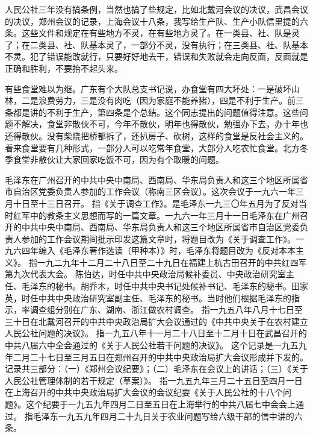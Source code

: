 人民公社三年没有搞条例，当然也搞了些规定，比如北戴河会议的决议，武昌会议的决议，郑州会议的记录，上海会议十八条，我写给生产队、生产小队信里提的六条。这些文件和规定在有些地方不灵，在有些地方灵了。在一类县、社、队是灵了；在二类县、社、队基本灵了，一部分不灵，没有执行；在三类县、社、队基本不灵。犯了错误能改就行，只要好好地去干，错误和失败就会走向反面，反面就是正确和胜利，不要抬不起头来。

有些食堂难以为继。广东有个大队总支书记说，办食堂有四大坏处：一是破坏山林，二是浪费劳力，三是没有肉吃（因为家庭不能养猪），四是不利于生产。前三条都是讲的不利于生产，第四条是个总结。这个同志提出的问题值得注意。这些问题不解决，食堂非散伙不可，今年不散伙，明年也得散伙，勉强办下去，办十年也还得散伙。没有柴烧把桥都拆了，还扒房子、砍树，这样的食堂是反社会主义的。看来食堂要有几种形式，一部分人可以吃常年食堂，大部分人吃农忙食堂。北方冬季食堂非散伙让大家回家吃饭不可，因为有个取暖的问题。

\begin{maonote}
毛泽东在广州召开的中共中央中南局、西南局、华东局负责人和这三个地区所属省市自治区党委负责人参加的工作会议（称南三区会议）。这次会议于一九六一年三月十日至十三日召开。
指《关于调查工作》。是毛泽东一九三〇年五月为了反对当时红军中的教条主义思想而写的一篇文章。一九六一年三月十一日毛泽东在广州召开的中共中央中南局、西南局、华东局负责人和这三个地区所属省市自治区党委负责人参加的工作会议期间批示印发这篇文章时，将题目改为《关于调查工作》。一九六四年编入《毛泽东著作选读（甲种本）》时，毛泽东将题目改为《反对本本主义》。
指一九二九年十二月二十八日至二十九日在福建上杭古田召开的中共红四军第九次代表大会。
陈伯达，时任中共中央政治局候补委员、中央政治研究室主任、毛泽东的秘书。胡乔木，时任中共中央书记处候补书记、毛泽东的秘书。田家英，时任中共中央政治研究室副主任、毛泽东的秘书。当时他们根据毛泽东的指示，率调查组分别在广东、湖南、浙江做农村调查。
指一九五八年八月十七日至三十日在北戴河召开的中共中央政治局扩大会议通过的《中共中央关于在农村建立人民公社问题的决议》。
指一九五八年十一月二十八日至十二月十日在武昌召开的中共八届六中全会通过的《关于人民公社若干问题的决议》。
这个记录是一九五九年二月二十七日至三月五日在郑州召开的中共中央政治局扩大会议形成并下发的。记录共三部分：（一）《郑州会议纪要》；（二）毛泽东在会议上的讲话；（三）《关于人民公社管理体制的若干规定（草案）》。
指一九五九年三月二十五日至四月一日在上海召开的中共中央政治局扩大会议的会议纪要《关于人民公社的十八个问题》。这个纪要于一九五九年四月二日至五日在上海举行的中共八届七中会会上通过。
指毛泽东一九五九年四月二十九日关于农业问题写给六级干部的信中讲的六条。
\end{maonote}
